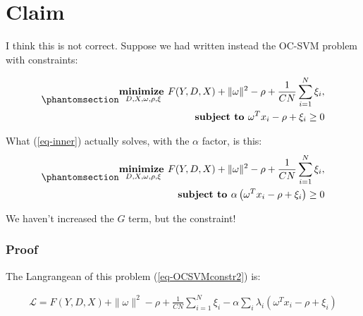 \documentclass[
  letterpaper,
  DIV=11,
  numbers=noendperiod]{scrartcl}
\begin{document}
\section{Claim}\label{claim}

I think this is not correct. Suppose we had written instead the OC-SVM
problem with constraints:

\begin{equation}\phantomsection\label{eq-OCSVMconstr}{
\begin{align}
\underset{D, X, \omega, \rho, \xi}{\textbf{minimize  }} F(Y, D, X) + \|\omega\|^2 - \rho + \frac{1}{CN} \sum_{i=1}^{N} \xi_i, \\
\textbf{subject to  } \omega^T x_i - \rho + \xi_i \geq 0\\
\end{align}
}\end{equation}

What (\ref{eq-inner}) actually solves, with the \(\alpha\) factor, is
this: \begin{equation}\phantomsection\label{eq-OCSVMconstr2}{
\begin{align}
\underset{D, X, \omega, \rho, \xi}{\textbf{minimize  }} F(Y, D, X) + \|\omega\|^2 - \rho + \frac{1}{CN} \sum_{i=1}^{N} \xi_i, \\
\textbf{subject to  } \alpha \left( \omega^T x_i - \rho + \xi_i \right) \geq 0\\
\end{align}
}\end{equation}

We haven't increased the \(G\) term, but the constraint!

\subsubsection{Proof}\label{proof}

The Langrangean of this problem (\ref{eq-OCSVMconstr2}) is:

\[
\begin{align}
\mathcal{L} = F(Y, D, X) + \|\omega\|^2 - \rho + \frac{1}{CN} \sum_{i=1}^{N} \xi_i - \alpha \sum_i \lambda_i \left(\omega^T x_i - \rho + \xi_i \right)
\end{align}
\]
\end{document}
